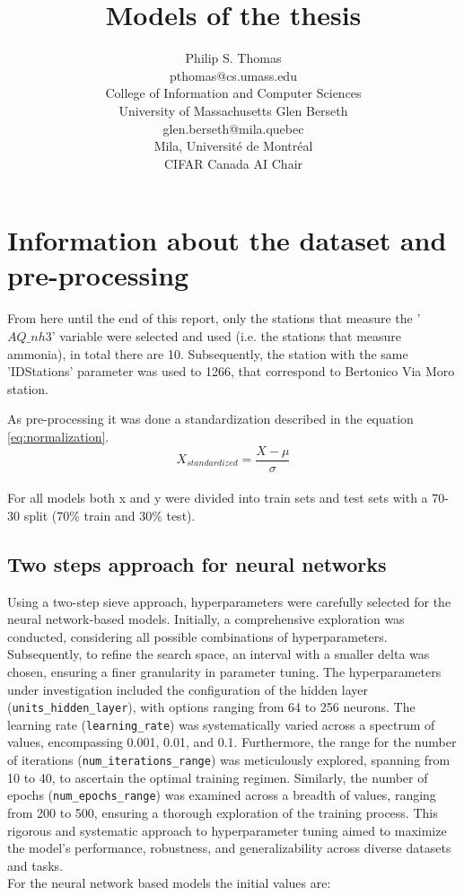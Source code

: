 \documentclass[10pt]{article} %
\title{Models of the thesis}
\author{Philip S. Thomas  \\
    pthomas@cs.umass.edu \\
    College of Information and Computer Sciences\\
    University of Massachusetts
    \And
    Glen Berseth \\
    glen.berseth@mila.quebec\\
    Mila, Universit\'e de Montr\'eal \\
    CIFAR Canada AI Chair}
\begin{document}
    
    \section{Information about the dataset and pre-processing}
    From here until the end of this report, only the stations that measure the '$AQ\_nh3$' variable were selected and used (i.e. the stations that measure ammonia), in total there are 10. Subsequently, the station with the same 'IDStations' parameter was used to 1266, that correspond to Bertonico Via Moro station.
    
    As pre-processing it was done a standardization described in the equation \ref{eq:normalization}.
      \begin{equation}
        X_{standardized} = \frac{X-\mu}{\sigma}
        \label{eq:normalization} 
    \end{equation}
    \\For all models both x and y were divided into train sets and test sets with a 70-30 split (70\% train and 30\% test).

    \subsection{Two steps approach for neural networks}
    Using a two-step sieve approach, hyperparameters were carefully selected for the neural network-based models. Initially, a comprehensive exploration was conducted, considering all possible combinations of hyperparameters. Subsequently, to refine the search space, an interval with a smaller delta was chosen, ensuring a finer granularity in parameter tuning. The hyperparameters under investigation included the configuration of the hidden layer (\texttt{units\_hidden\_layer}), with options ranging from 64 to 256 neurons. The learning rate (\texttt{learning\_rate}) was systematically varied across a spectrum of values, encompassing 0.001, 0.01, and 0.1. Furthermore, the range for the number of iterations (\texttt{num\_iterations\_range}) was meticulously explored, spanning from 10 to 40, to ascertain the optimal training regimen. Similarly, the number of epochs (\texttt{num\_epochs\_range}) was examined across a breadth of values, ranging from 200 to 500, ensuring a thorough exploration of the training process. This rigorous and systematic approach to hyperparameter tuning aimed to maximize the model's performance, robustness, and generalizability across diverse datasets and tasks.
    \\For the neural network based models the initial values are:
\end{document}
